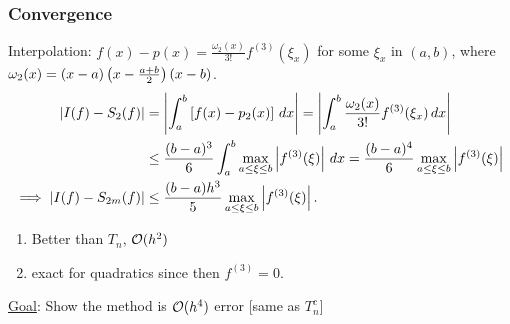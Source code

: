 \documentclass[]{article}
\begin{document}
\subsubsection*{Convergence}

Interpolation: $f(x)-p(x) = \frac{\omega_2(x)}{3!} f^{(3)}(\xi_x)$ for some $\xi_x$ in $(a,b)$, where $\omega_2(x) = (x-a)\left(x-\frac{a+b}2\right)(x-b)$.
\begin{align*}
	|I(f)-S_2(f)|
	&= \left|\int_a^b\left[f(x)-p_2(x)\right]\,dx\right|
	= \left|\int_a^b \frac{\omega_2(x)}{3!} f^{(3)}(\xi_x)\,dx\right| \\
	&\leq \frac{(b-a)^3}6\int_a^b \max_{a\leq\xi\leq b} \left|f^{(3)}(\xi)\right|\,dx
	= \frac{(b-a)^4}6 \max_{a\leq\xi\leq b}\left|f^{(3)}(\xi)\right| \\
	\implies |I(f)-S_{2m}(f)|
	&\leq \frac{(b-a)h^3}5 \max_{a\leq\xi\leq b} \left|f^{(3)}(\xi)\right|.
\end{align*}
\begin{enumerate}
	\item Better than $T_n$, $\mathcal{O}(h^2)$
	\item exact for quadratics since then $f^{(3)}=0$.
\end{enumerate}

\ul{Goal}: Show the method is $\mathcal{O}(h^4)$ error [same as $T_n^c$]
\end{document}
